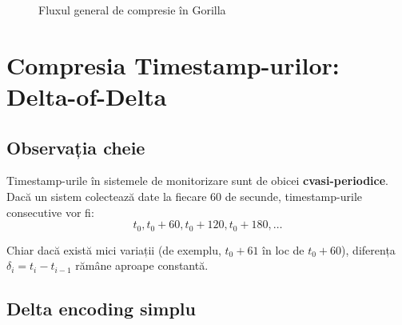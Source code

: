 \begin{figure}[h]
\centering
{}
\caption{Fluxul general de compresie în Gorilla}
\label{fig:compression-overview}
\end{figure}

\section{Compresia Timestamp-urilor: Delta-of-Delta}
\label{sec:dod}

\subsection{Observația cheie}

Timestamp-urile în sistemele de monitorizare sunt de obicei \textbf{cvasi-periodice}. Dacă un sistem colectează date la fiecare 60 de secunde, timestamp-urile consecutive vor fi:
\begin{equation}
    t_0, t_0 + 60, t_0 + 120, t_0 + 180, \ldots
\end{equation}

Chiar dacă există mici variații (de exemplu, $t_0 + 61$ în loc de $t_0 + 60$), diferența $\delta_i = t_i - t_{i-1}$ rămâne aproape constantă.

\subsection{Delta encoding simplu}


